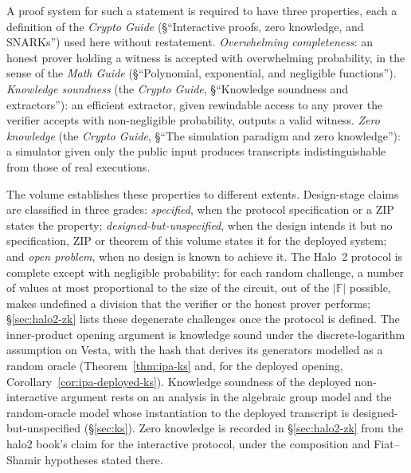 \documentclass[11pt,a4paper]{article}
\theoremstyle{definition}
\newcommand{\F}{\mathbb{F}}
\begin{document}
A proof system for such a statement is required to have three
properties, each a definition of the \emph{Crypto Guide}
(\S``Interactive proofs, zero knowledge, and SNARKs'') used here without
restatement. \emph{Overwhelming completeness}: an honest prover holding
a witness is accepted with overwhelming probability, in the sense of the
\emph{Math Guide} (\S``Polynomial, exponential, and negligible
functions''). \emph{Knowledge soundness} (the \emph{Crypto Guide},
\S``Knowledge soundness and extractors''): an efficient extractor, given
rewindable access to any prover the verifier accepts with non-negligible
probability, outputs a valid witness. \emph{Zero knowledge} (the
\emph{Crypto Guide}, \S``The simulation paradigm and zero knowledge''):
a simulator given only the public input produces transcripts
indistinguishable from those of real executions.

The volume establishes these properties to different extents. Design-stage
claims are classified in three grades: \emph{specified}, when the
protocol specification or a ZIP states the property;
\emph{designed-but-unspecified}, when the design intends it but no
specification, ZIP or theorem of this volume states it for the deployed
system; and \emph{open problem}, when no design is known to achieve it. The
Halo~2 protocol is complete except with negligible probability: for each random
challenge, a number of values at most proportional to the size of the circuit,
out of the $|\F|$ possible, makes undefined a division that the verifier or the
honest prover performs; \S\ref{sec:halo2-zk} lists these degenerate challenges
once the protocol is defined. The inner-product opening argument is knowledge
sound under the discrete-logarithm assumption on Vesta, with the hash that
derives its generators modelled as a random oracle (Theorem~\ref{thm:ipa-ks}
and, for the deployed opening, Corollary~\ref{cor:ipa-deployed-ks}). Knowledge
soundness of the deployed non-interactive argument rests on an analysis in the
algebraic group model and the random-oracle model whose instantiation to the
deployed transcript is designed-but-unspecified (\S\ref{sec:ks}). Zero knowledge
is recorded in \S\ref{sec:halo2-zk} from the halo2 book's claim for the
interactive protocol, under the composition and
Fiat--Shamir hypotheses stated there.
\end{document}
